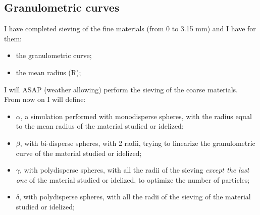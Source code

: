 \subsection{Granulometric curves}
\label{subsection:granulometric curves}

I have completed sieving of the fine materials (from 0 to 3.15 mm) and I have for them:
\begin{itemize}
\item{the granulometric curve;}
\item{the mean radius (R);}
\end{itemize}
I will ASAP (weather allowing) perform the sieving of the coarse materials.\\

From now on I will define:
\begin{itemize}
\item{$\alpha$, a simulation performed with monodisperse spheres, with the radius equal to the mean radius of the material studied or idelized;}
\item{$\beta$, with bi-disperse spheres, with 2 radii, trying to linearize the granulometric curve of the material studied or idelized;}
\item{$\gamma$, with polydisperse spheres, with all the radii of the sieving \textit{except the last one} of the material studied or idelized, to optimize the number of particles;}
\item{$\delta$, with polydisperse spheres, with all the radii of the sieving of the material studied or idelized;}
\end{itemize}


